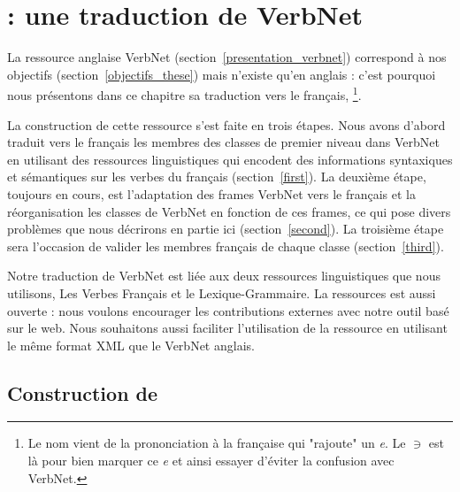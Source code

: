 \chapter{\verbenet{} : une traduction de VerbNet}
\label{ch:verbnet}

La ressource anglaise VerbNet (section~\ref{presentation_verbnet}) correspond à
nos objectifs (section~\ref{objectifs_these}) mais n'existe qu'en anglais :
c'est pourquoi nous présentons dans ce chapitre sa traduction vers le français,
\verbenet{}\footnote{Le nom vient de la prononciation à la française qui
"rajoute" un \emph{e}. Le $\ni$ est là pour bien marquer ce \emph{e} et ainsi
essayer d'éviter la confusion avec VerbNet.}.

La construction de cette ressource s'est faite en trois étapes. Nous avons
d'abord traduit vers le français les membres des classes de premier niveau dans
VerbNet en utilisant des ressources linguistiques qui encodent des informations
syntaxiques et sémantiques sur les verbes du français (section~\ref{first}). La
deuxième étape, toujours en cours, est l'adaptation des frames VerbNet vers le
français et la réorganisation les classes de VerbNet en fonction de ces frames,
ce qui pose divers problèmes que nous décrirons en partie ici
(section~\ref{second}). La troisième étape sera l'occasion de valider les
membres français de chaque classe (section~\ref{third}).

Notre traduction de VerbNet est liée aux deux ressources linguistiques que nous
utilisons, Les Verbes Français et le Lexique-Grammaire. La ressources est aussi
ouverte : nous voulons encourager les contributions externes avec notre outil
basé sur le web. Nous souhaitons aussi faciliter l'utilisation de la ressource
en utilisant le même format XML que le VerbNet anglais.

\section{Construction de \verbenet{}}

